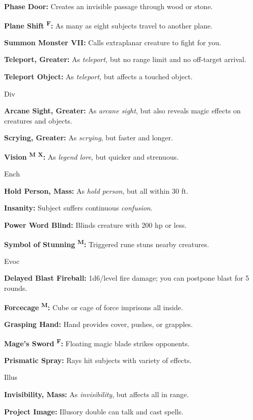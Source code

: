 \documentclass{article}
\begin{document}
\textbf{Phase Door:} Creates an invisible passage through wood or stone.

\textbf{Plane Shift }\textsuperscript{\textbf{F}}\textbf{:} As many as eight subjects 
travel to another plane.

\textbf{Summon Monster VII:} Calls extraplanar creature to fight for you.

\textbf{Teleport, Greater:} As \textit{teleport, }but no range limit and no off-target 
arrival.

\textbf{Teleport Object:} As \textit{teleport, }but affects a touched object.

Div

\textbf{Arcane Sight, Greater:} As \textit{arcane sight}, but also reveals magic 
effects on creatures and objects.

\textbf{Scrying, Greater:} As \textit{scrying}, but faster and longer.

\textbf{Vision }\textsuperscript{\textbf{M}}{\scriptsize{}\textbf{ }}\textsuperscript{\textbf{X}}\textbf{:} 
As \textit{legend lore}, but quicker and strenuous.

Ench

\textbf{Hold Person, Mass:} As \textit{hold person}, but all within 30 ft.

\textbf{Insanity:} Subject suffers continuous \textit{confusion}.

\textbf{Power Word Blind:} Blinds creature with 200 hp or less.

\textbf{Symbol of Stunning }\textsuperscript{\textbf{M}}\textbf{:} Triggered rune 
stuns nearby creatures.

Evoc

\textbf{Delayed Blast Fireball:} 1d6/level fire damage; you can postpone blast 
for 5 rounds.

\textbf{Forcecage }\textsuperscript{\textbf{M}}\textbf{:} Cube or cage of force 
imprisons all inside.

\textbf{Grasping Hand:} Hand provides cover, pushes, or grapples.

\textbf{Mage's Sword }\textsuperscript{\textbf{F}}\textbf{:} Floating magic blade 
strikes opponents.

\textbf{Prismatic Spray:} Rays hit subjects with variety of effects.

Illus

\textbf{Invisibility, Mass:} As \textit{invisibility}, but affects all in range.

\textbf{Project Image:} Illusory double can talk and cast spells.
\end{document}
